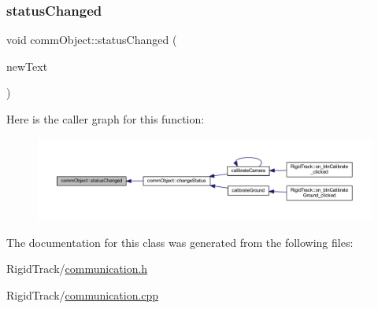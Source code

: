 \subsubsection{\texorpdfstring{status\+Changed}{statusChanged}}
{\footnotesize\ttfamily void comm\+Object\+::status\+Changed (\begin{DoxyParamCaption}\item[{Q\+String}]{new\+Text }\end{DoxyParamCaption})\hspace{0.3cm}{\ttfamily [signal]}}

Here is the caller graph for this function\+:
\nopagebreak
\begin{figure}[H]
\begin{center}
\leavevmode
\includegraphics[width=350pt]{classcomm_object_adccf5b5946d35d5cf6d76f367f93e335_icgraph}
\end{center}
\end{figure}


The documentation for this class was generated from the following files\+:\begin{DoxyCompactItemize}
\item 
Rigid\+Track/\hyperlink{communication_8h}{communication.\+h}\item 
Rigid\+Track/\hyperlink{communication_8cpp}{communication.\+cpp}\end{DoxyCompactItemize}
